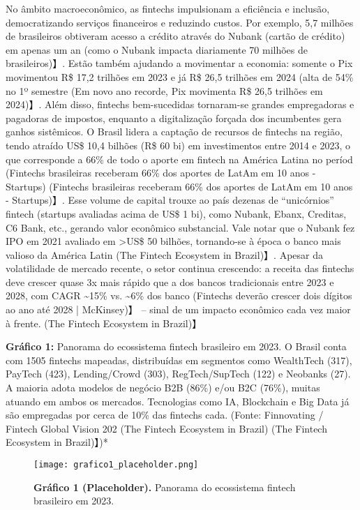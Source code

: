 \documentclass[12pt]{article}
\begin{document}
No âmbito macroeconômico, as fintechs impulsionam a eficiência e inclusão, democratizando serviços financeiros e reduzindo custos. Por exemplo, 5,7 milhões de brasileiros obtiveram acesso a crédito através do Nubank (cartão de crédito) em apenas um an (como o Nubank impacta diariamente 70 milhões de brasileiros)】. Estão também ajudando a movimentar a economia: somente o Pix movimentou R\$ 17,2 trilhões em 2023 e já R\$ 26,5 trilhões em 2024 (alta de 54\% no 1º semestre (Em novo ano recorde, Pix movimenta R\$ 26,5 trilhões em 2024)】. Além disso, fintechs bem-sucedidas tornaram-se grandes empregadoras e pagadoras de impostos, enquanto a digitalização forçada dos incumbentes gera ganhos sistêmicos. O Brasil lidera a captação de recursos de fintechs na região, tendo atraído US\$ 10,4 bilhões (R\$ 60 bi) em investimentos entre 2014 e 2023, o que corresponde a 66\% de todo o aporte em fintech na América Latina no períod (Fintechs brasileiras receberam 66\% dos aportes de LatAm em 10 anos - Startups) (Fintechs brasileiras receberam 66\% dos aportes de LatAm em 10 anos - Startups)】. Esse volume de capital trouxe ao país dezenas de “unicórnios” fintech (startups avaliadas acima de US\$ 1 bi), como Nubank, Ebanx, Creditas, C6 Bank, etc., gerando valor econômico substancial. Vale notar que o Nubank fez IPO em 2021 avaliado em >US\$ 50 bilhões, tornando-se à época o banco mais valioso da América Latin (The Fintech Ecosystem in Brazil)】. Apesar da volatilidade de mercado recente, o setor continua crescendo: a receita das fintechs deve crescer quase 3x mais rápido que a dos bancos tradicionais entre 2023 e 2028, com CAGR \textasciitilde15\% vs. \textasciitilde6\% dos banco (Fintechs deverão crescer dois dígitos ao ano até 2028 | McKinsey)】 – sinal de um impacto econômico cada vez maior à frente. (The Fintech Ecosystem in Brazil)】 

\textbf{Gráfico 1:} Panorama do ecossistema fintech brasileiro em 2023. O Brasil conta com 1505 fintechs mapeadas, distribuídas em segmentos como WealthTech (317), PayTech (423), Lending/Crowd (303), RegTech/SupTech (122) e Neobanks (27). A maioria adota modelos de negócio B2B (86\%) e/ou B2C (76\%), muitas atuando em ambos os mercados. Tecnologias como IA, Blockchain e Big Data já são empregadas por cerca de 10\% das fintechs cada. (Fonte: Finnovating / Fintech Global Vision 202 (The Fintech Ecosystem in Brazil) (The Fintech Ecosystem in Brazil)】)*

\begin{figure}[!h]
\centering
\texttt{[image: grafico1\_placeholder.png]}
\caption{\textbf{Gráfico 1 (Placeholder).} Panorama do ecossistema fintech brasileiro em 2023.}
\label{fig:graph1}
\end{figure}
\end{document}
